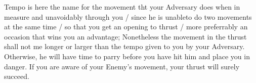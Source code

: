 

Tempo is here the name for the movement tht your Adversary does when
in measure and unavoidably through you / since he is unableto do two
movements at the same time / so that you get an opening to thrust /
more preferrably an occasion that wins you an advantage; Nonetheless
the movement in the thrust shall not me longer or larger than the
tempo given to you by your Adversary. Otherwise, he will have time to
parry before you have hit him and place you in danger. If you are
aware of your Enemy's movement, your thrust will surely succeed.
